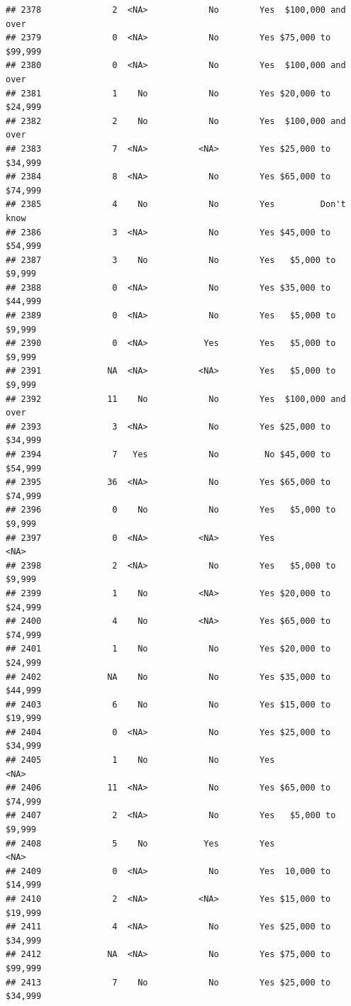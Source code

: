 \documentclass[man]{apa6}
\begin{document}
\begin{verbatim}
## 2378              2  <NA>            No        Yes  $100,000 and over
## 2379              0  <NA>            No        Yes $75,000 to $99,999
## 2380              0  <NA>            No        Yes  $100,000 and over
## 2381              1    No            No        Yes $20,000 to $24,999
## 2382              2    No            No        Yes  $100,000 and over
## 2383              7  <NA>          <NA>        Yes $25,000 to $34,999
## 2384              8  <NA>            No        Yes $65,000 to $74,999
## 2385              4    No            No        Yes         Don't know
## 2386              3  <NA>            No        Yes $45,000 to $54,999
## 2387              3    No            No        Yes   $5,000 to $9,999
## 2388              0  <NA>            No        Yes $35,000 to $44,999
## 2389              0  <NA>            No        Yes   $5,000 to $9,999
## 2390              0  <NA>           Yes        Yes   $5,000 to $9,999
## 2391             NA  <NA>          <NA>        Yes   $5,000 to $9,999
## 2392             11    No            No        Yes  $100,000 and over
## 2393              3  <NA>            No        Yes $25,000 to $34,999
## 2394              7   Yes            No         No $45,000 to $54,999
## 2395             36  <NA>            No        Yes $65,000 to $74,999
## 2396              0    No            No        Yes   $5,000 to $9,999
## 2397              0  <NA>          <NA>        Yes               <NA>
## 2398              2  <NA>            No        Yes   $5,000 to $9,999
## 2399              1    No          <NA>        Yes $20,000 to $24,999
## 2400              4    No          <NA>        Yes $65,000 to $74,999
## 2401              1    No            No        Yes $20,000 to $24,999
## 2402             NA    No            No        Yes $35,000 to $44,999
## 2403              6    No            No        Yes $15,000 to $19,999
## 2404              0  <NA>            No        Yes $25,000 to $34,999
## 2405              1    No            No        Yes               <NA>
## 2406             11  <NA>            No        Yes $65,000 to $74,999
## 2407              2  <NA>            No        Yes   $5,000 to $9,999
## 2408              5    No           Yes        Yes               <NA>
## 2409              0  <NA>            No        Yes  10,000 to $14,999
## 2410              2  <NA>          <NA>        Yes $15,000 to $19,999
## 2411              4  <NA>            No        Yes $25,000 to $34,999
## 2412             NA  <NA>            No        Yes $75,000 to $99,999
## 2413              7    No            No        Yes $25,000 to $34,999

\end{verbatim}
\end{document}

